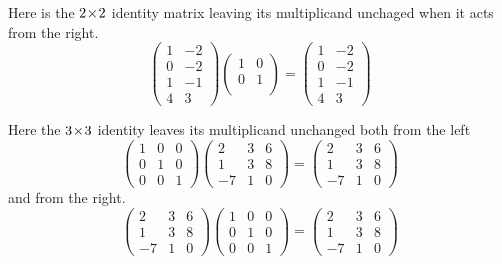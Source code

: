\begin{example}
Here is the \( 2 \! \times \! 2 \) identity matrix leaving its multiplicand unchaged
when it acts from the right.
\begin{equation*}
    \begin{pmatrix}
       1  &-2 \\
       0  &-2 \\
       1  &-1 \\
       4  &3
    \end{pmatrix}
    \begin{pmatrix}
       1  &0  \\
       0  &1  \\
    \end{pmatrix}
  =
    \begin{pmatrix}
       1  &-2 \\
       0  &-2 \\
       1  &-1 \\
       4  &3
    \end{pmatrix}
\end{equation*}
\end{example}

\begin{example}
Here the \( 3 \! \times \! 3 \) identity
leaves its multiplicand unchanged both from the left
\begin{equation*}
    \begin{pmatrix}
       1  &0  &0  \\
       0  &1  &0  \\
       0  &0  &1
    \end{pmatrix}
    \begin{pmatrix}
       2  &3  &6  \\
       1  &3  &8  \\
      -7  &1  &0
    \end{pmatrix}
  =
    \begin{pmatrix}
       2  &3  &6  \\
       1  &3  &8  \\
      -7  &1  &0
    \end{pmatrix}
\end{equation*}
and from the right.
\begin{equation*}
    \begin{pmatrix}
       2  &3  &6  \\
       1  &3  &8  \\
      -7  &1  &0
    \end{pmatrix}
    \begin{pmatrix}
       1  &0  &0  \\
       0  &1  &0  \\
       0  &0  &1
    \end{pmatrix}
  =
    \begin{pmatrix}
       2  &3  &6  \\
       1  &3  &8  \\
      -7  &1  &0
    \end{pmatrix}
\end{equation*}
\end{example}

